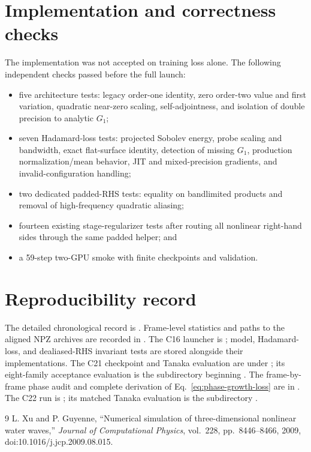 \documentclass[11pt]{article}
\begin{document}
\section{Implementation and correctness checks}

The implementation was not accepted on training loss alone.  The following
independent checks passed before the full launch:
\begin{itemize}
  \item five architecture tests: legacy order-one identity, zero order-two
        value and first variation, quadratic near-zero scaling,
        self-adjointness, and isolation of double precision to analytic \(G_1\);
  \item seven Hadamard-loss tests: projected Sobolev energy, probe scaling and
        bandwidth, exact flat-surface identity, detection of missing \(G_1\),
        production normalization/mean behavior, JIT and mixed-precision
        gradients, and invalid-configuration handling;
  \item two dedicated padded-RHS tests: equality on bandlimited products and
        removal of high-frequency quadratic aliasing;
  \item fourteen existing stage-regularizer tests after routing all nonlinear
        right-hand sides through the same padded helper; and
  \item a 59-step two-GPU smoke with finite checkpoints and validation.
\end{itemize}

\section*{Reproducibility record}

The detailed chronological record is .  Frame-level
statistics and paths to the aligned NPZ archives are recorded in
.  The C16 launcher
is ; model, Hadamard-loss, and
dealiased-RHS invariant tests are stored alongside their implementations.  The
C21 checkpoint and Tanaka evaluation are under
; its eight-family
acceptance evaluation is the subdirectory beginning
.  The frame-by-frame phase
audit and complete derivation of Eq.~\eqref{eq:phase-growth-loss} are in
.  The C22 run is
; its matched Tanaka
evaluation is the subdirectory
.

\begin{thebibliography}{9}
L. Xu and P. Guyenne,
``Numerical simulation of three-dimensional nonlinear water waves,''
\emph{Journal of Computational Physics}, vol.~228, pp.~8446--8466, 2009,
doi:10.1016/j.jcp.2009.08.015.
\end{thebibliography}
\end{document}
